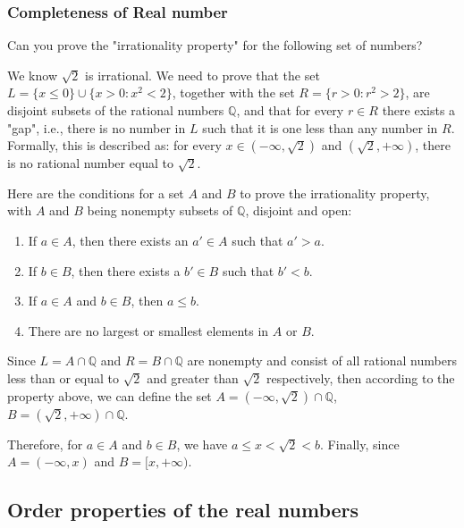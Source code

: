 \documentclass{article}
\begin{document}
\subsubsection{Completeness of Real number}

Can you prove the "irrationality property" for the following set of numbers?

We know $\sqrt{2}$ is irrational. We need to prove that the set 
$L = \{ x \leq 0 \} \cup \{ x > 0 : x^2 < 2 \}$, 
together with the set $R = \{ r > 0 : r^2 > 2 \}$, 
are disjoint subsets of the rational numbers $\mathbb{Q}$, 
and that for every $r \in R$ there exists a "gap", 
i.e., there is no number in $L$ such that it is one less than any number in $R$. 
Formally, this is described as: for every $x \in (-\infty, \sqrt{2})$ 
and $(\sqrt{2}, +\infty)$, there is no rational number equal to $\sqrt{2}$.

Here are the conditions for a set $A$ and $B$ to prove the irrationality property, 
with $A$ and $B$ being nonempty subsets of $\mathbb{Q}$, disjoint and open:

\begin{enumerate}
  \item If $a \in A$, then there exists an $a' \in A$ such that $a' > a$.
  \item If $b \in B$, then there exists a $b' \in B$ such that $b' < b$.
  \item If $a \in A$ and $b \in B$, then $a \leq b$.
  \item There are no largest or smallest elements in $A$ or $B$.
\end{enumerate}

Since $L = A \cap \mathbb{Q}$ and $R = B \cap \mathbb{Q}$ are nonempty and consist of all rational numbers less than or equal to $\sqrt{2}$ and greater than $\sqrt{2}$ respectively, then according to the property above, we can define the set $A = (-\infty, \sqrt{2}) \cap \mathbb{Q}$, $B = (\sqrt{2}, +\infty) \cap \mathbb{Q}$.

Therefore, for $a \in A$ and $b \in B$, we have $a \leq x < \sqrt{2} < b$. Finally, since $A = (-\infty, x)$ and $B = [x, +\infty)$.







\clearpage
\subsection{Order properties of the real numbers}
\clearpage
\end{document}

